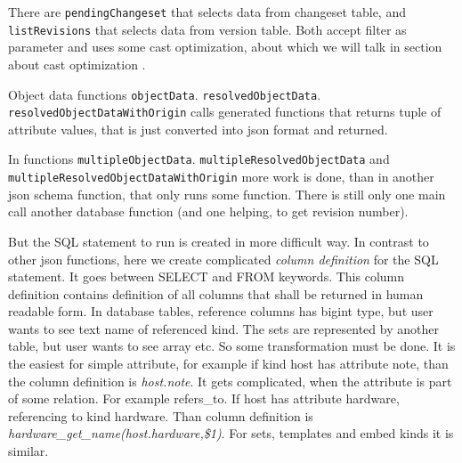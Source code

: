 \documentclass[deska]{subfiles}
\begin{document}
There are {\tt pendingChangeset} that selects data from changeset table, and {\tt listRevisions} that selects data from version table.
Both accept filter as parameter and uses some cast optimization, about which we will talk in section about cast
optimization .

Object data functions {\tt objectData}. {\tt resolvedObjectData}. {\tt resolvedObjectDataWithOrigin} calls generated functions 
that returns tuple of attribute values, that is just converted into json format and returned. 

In functions {\tt multipleObjectData}. {\tt multipleResolvedObjectData} and {\tt multipleResolvedObjectDataWithOrigin}
more work is done, than in another json schema function, that only runs some function.
There is still only one main call another database function (and one helping, to get revision number).

But the SQL statement to run is created in more difficult way. In contrast to other json functions,
here we create complicated {\em column definition} for the SQL statement. It goes between SELECT and FROM keywords.
This column definition contains definition of all columns that shall be returned in human readable form.
In database tables, reference columns has bigint type, but user wants to see text name of referenced kind.
The sets are represented by another table, but user wants to see array etc. So some transformation must be done.
It is the easiest for simple attribute,
for example if kind host has attribute note, than the column definition is {\em host.note}.
It gets complicated, when the attribute is part of some relation. For example refers\_to.
If host has attribute hardware, referencing to kind hardware. Than column definition is 
{\em hardware\_get\_name(host.hardware,\$1)}. For sets, templates and embed kinds it is similar.
\end{document}
